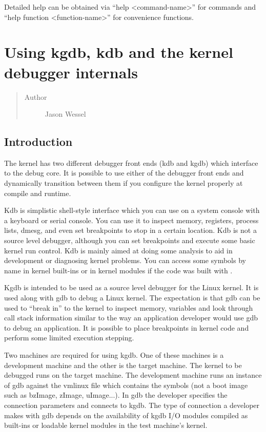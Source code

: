 \documentclass[a4paper,8pt,english]{sphinxmanual}
\begin{document}
Detailed help can be obtained via ``help \textless{}command-name\textgreater{}'' for commands and ``help
function \textless{}function-name\textgreater{}'' for convenience functions.


\chapter{Using kgdb, kdb and the kernel debugger internals}
\label{dev-tools/kgdb:using-kgdb-kdb-and-the-kernel-debugger-internals}\label{dev-tools/kgdb::doc}\begin{quote}\begin{description}
\item[{Author}] \leavevmode
Jason Wessel

\end{description}\end{quote}


\section{Introduction}
\label{dev-tools/kgdb:introduction}
The kernel has two different debugger front ends (kdb and kgdb) which
interface to the debug core. It is possible to use either of the
debugger front ends and dynamically transition between them if you
configure the kernel properly at compile and runtime.

Kdb is simplistic shell-style interface which you can use on a system
console with a keyboard or serial console. You can use it to inspect
memory, registers, process lists, dmesg, and even set breakpoints to
stop in a certain location. Kdb is not a source level debugger, although
you can set breakpoints and execute some basic kernel run control. Kdb
is mainly aimed at doing some analysis to aid in development or
diagnosing kernel problems. You can access some symbols by name in
kernel built-ins or in kernel modules if the code was built with
.

Kgdb is intended to be used as a source level debugger for the Linux
kernel. It is used along with gdb to debug a Linux kernel. The
expectation is that gdb can be used to ``break in'' to the kernel to
inspect memory, variables and look through call stack information
similar to the way an application developer would use gdb to debug an
application. It is possible to place breakpoints in kernel code and
perform some limited execution stepping.

Two machines are required for using kgdb. One of these machines is a
development machine and the other is the target machine. The kernel to
be debugged runs on the target machine. The development machine runs an
instance of gdb against the vmlinux file which contains the symbols (not
a boot image such as bzImage, zImage, uImage...). In gdb the developer
specifies the connection parameters and connects to kgdb. The type of
connection a developer makes with gdb depends on the availability of
kgdb I/O modules compiled as built-ins or loadable kernel modules in the
test machine's kernel.
\end{document}

